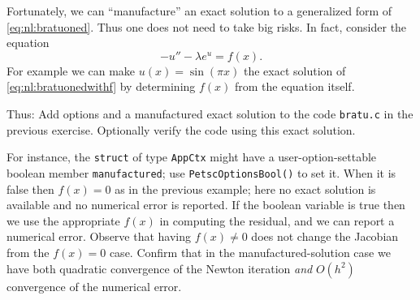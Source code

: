 \begin{enumerate}
Fortunately, we can ``manufacture'' \citep{Wesseling2001} an exact solution to a generalized form of \eqref{eq:nl:bratuoned}.  Thus one does not need to take big risks.  In fact, consider the equation
\begin{equation}
    - u'' - \lambda e^u = f(x). \label{eq:nl:bratuonedwithf}
\end{equation}
For example we can make $u(x) = \sin(\pi x)$ the exact solution of \eqref{eq:nl:bratuonedwithf} by determining $f(x)$ from the equation itself.

Thus: Add options and a manufactured exact solution to the code \texttt{bratu.c} in the previous exercise.  Optionally verify the code using this exact solution.

For instance, the \texttt{struct} of type \texttt{AppCtx} might have a user-option-settable boolean member \texttt{manufactured}; use \texttt{PetscOptionsBool()} to set it.  When it is false then $f(x)=0$ as in the previous example; here no exact solution is available and no numerical error is reported.  If the boolean variable is true then we use the appropriate $f(x)$ in computing the residual, and we can report a numerical error.  Observe that having $f(x)\ne 0$ does not change the Jacobian from the $f(x)=0$ case.  Confirm that in the manufactured-solution case we have both quadratic convergence of the Newton iteration \emph{and} $O(h^2)$ convergence of the numerical error.

\end{enumerate}